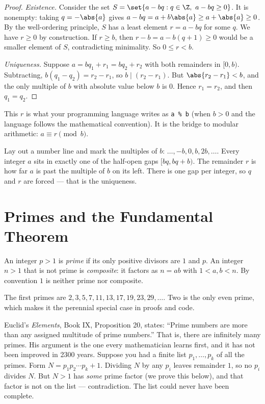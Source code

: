 \begin{proof}
\emph{Existence.} Consider the set $S = \set{a - bq : q \in \Z,\ a - bq \ge 0}$. It is nonempty:
taking $q = -\abs{a}$ gives $a - bq = a + b\abs{a} \ge a + \abs{a} \ge 0$. By the well-ordering
principle, $S$ has a least element $r = a - bq$ for some $q$. We have $r \ge 0$ by construction.
If $r \ge b$, then $r - b = a - b(q+1) \ge 0$ would be a smaller element of $S$, contradicting
minimality. So $0 \le r < b$.

\emph{Uniqueness.} Suppose $a = bq_1 + r_1 = bq_2 + r_2$ with both remainders in $[0, b)$.
Subtracting, $b(q_1 - q_2) = r_2 - r_1$, so $b \mid (r_2 - r_1)$. But $\abs{r_2 - r_1} < b$, and the
only multiple of $b$ with absolute value below $b$ is $0$. Hence $r_1 = r_2$, and then
$q_1 = q_2$.
\end{proof}

This $r$ is what your programming language writes as \texttt{a \% b} (when $b > 0$ and the language
follows the mathematical convention). It is the bridge to modular arithmetic: $a \equiv r
\pmod{b}$.

\begin{intuitionbox}
Lay out a number line and mark the multiples of $b$: $\dots, -b, 0, b, 2b, \dots$. Every integer
$a$ sits in exactly one of the half-open gaps $[bq, bq+b)$. The remainder $r$ is how far $a$ is
past the multiple of $b$ on its left. There is one gap per integer, so $q$ and $r$ are forced ---
that is the uniqueness.
\end{intuitionbox}

\section{Primes and the Fundamental Theorem}
\label{ch04:primes}

\begin{definition}
\label{ch04:def-prime}
An integer $p > 1$ is \emph{prime} if its only positive divisors are $1$ and $p$. An integer
$n > 1$ that is not prime is \emph{composite}: it factors as $n = ab$ with $1 < a, b < n$. By
convention $1$ is neither prime nor composite.
\end{definition}

The first primes are $2, 3, 5, 7, 11, 13, 17, 19, 23, 29, \dots$. Two is the only even prime, which
makes it the perennial special case in proofs and code.

\begin{historybox}
Euclid's \emph{Elements}, Book IX, Proposition 20, states: ``Prime numbers are more than any
assigned multitude of prime numbers.'' That is, there are infinitely many primes. His argument is
the one every mathematician learns first, and it has not been improved in 2300 years. Suppose you
had a finite list $p_1, \dots, p_k$ of all the primes. Form $N = p_1 p_2 \cdots p_k + 1$. Dividing
$N$ by any $p_i$ leaves remainder $1$, so no $p_i$ divides $N$. But $N > 1$ has \emph{some} prime
factor (we prove this below), and that factor is not on the list --- contradiction. The list could
never have been complete.
\end{historybox}


